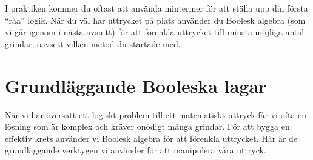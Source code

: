 \documentclass[
  swedish,
  letterpaper,
  oneside,
  openany]{book}
\begin{document}
\begin{tcolorbox}[enhanced jigsaw, arc=.35mm, bottomrule=.15mm, bottomtitle=1mm, breakable, colback=white, colbacktitle=quarto-callout-tip-color!10!white, colframe=quarto-callout-tip-color-frame, coltitle=black, left=2mm, leftrule=.75mm, opacityback=0, opacitybacktitle=0.6, rightrule=.15mm, title=\textcolor{quarto-callout-tip-color}{\faLightbulb}\hspace{0.5em}{Tips från ingenjören:}, titlerule=0mm, toprule=.15mm, toptitle=1mm]

I praktiken kommer du oftast att använda mintermer för att ställa upp
din första ``råa'' logik. När du väl har uttrycket på plats använder du
Boolesk algebra (som vi går igenom i nästa avsnitt) för att förenkla
uttrycket till minsta möjliga antal grindar, oavsett vilken metod du
startade med.

\end{tcolorbox}

\section{Grundläggande Booleska
lagar}\label{grundluxe4ggande-booleska-lagar}

När vi har översatt ett logiskt problem till ett matematiskt uttryck får
vi ofta en lösning som är komplex och kräver onödigt många grindar. För
att bygga en effektiv krets använder vi Boolesk algebra för att förenkla
uttrycket. Här är de grundläggande verktygen vi använder för att
manipulera våra uttryck.
\end{document}
